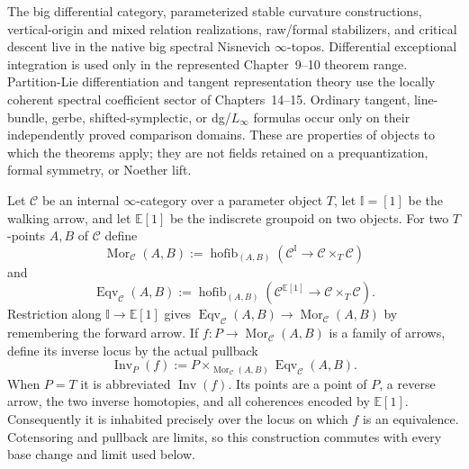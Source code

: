 \begin{convention}
\label{conv:prequantum-theorem-domains}
The big differential category, parameterized stable curvature constructions,
vertical-origin and mixed relation realizations, raw/formal stabilizers, and
critical descent live in the native big spectral Nisnevich $\infty$-topos.
Differential exceptional integration is used only in the represented
Chapter~9--10 theorem range.  Partition-Lie differentiation and tangent
representation theory use the locally coherent spectral coefficient sector of
Chapters~14--15.  Ordinary tangent, line-bundle, gerbe, shifted-symplectic, or
dg/$L_\infty$ formulas occur only on their independently proved comparison
domains.  These are properties of objects to which the theorems apply; they are
not fields retained on a prequantization, formal symmetry, or Noether lift.
\end{convention}

\begin{construction}
\label{constr:prequantum-walking-equivalence-inverse-locus}
Let $\mathcal C$ be an internal $\infty$-category over a parameter object $T$,
let $\mathbb I=[1]$ be the walking arrow, and let $\mathbb E[1]$ be the
indiscrete groupoid on two objects.  For two $T$-points $A,B$ of $\mathcal C$
define
\[
\operatorname{Mor}_{\mathcal C}(A,B)
:=
\operatorname{hofib}_{(A,B)}
\left(\mathcal C^{\mathbb I}\longrightarrow
      \mathcal C\times_T\mathcal C\right)
\]
and
\[
\boxed{
\operatorname{Eqv}_{\mathcal C}(A,B)
:=
\operatorname{hofib}_{(A,B)}
\left(\mathcal C^{\mathbb E[1]}\longrightarrow
      \mathcal C\times_T\mathcal C\right).
}
\]
Restriction along $\mathbb I\to\mathbb E[1]$ gives
$\operatorname{Eqv}_{\mathcal C}(A,B)\to
\operatorname{Mor}_{\mathcal C}(A,B)$ by remembering the forward arrow.  If
$f:P\to\operatorname{Mor}_{\mathcal C}(A,B)$ is a family of arrows, define its
inverse locus by the actual pullback
\[
\boxed{
\operatorname{Inv}_{P}(f)
:=
P\times_{\operatorname{Mor}_{\mathcal C}(A,B)}
\operatorname{Eqv}_{\mathcal C}(A,B).
}
\]
When $P=T$ it is abbreviated $\operatorname{Inv}(f)$.  Its points are a point of
$P$, a reverse arrow, the two inverse homotopies, and all coherences encoded by
$\mathbb E[1]$.  Consequently it is inhabited precisely over the locus on which
$f$ is an equivalence.  Cotensoring and pullback are limits, so this construction
commutes with every base change and limit used below.
\end{construction}

